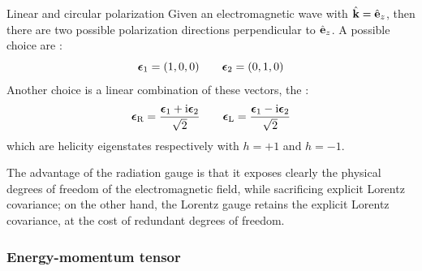 \begin{example}{Linear and circular polarization}{}
  Given an electromagnetic wave with $ \hat{\mathbf{k}} = \hat{\mathbf{e}}_z $, then there are two possible polarization directions perpendicular to $ \hat{\mathbf{e}}_z $. A possible choice are :
  \begin{equation}
    \boldsymbol{\epsilon}_1 = (1, 0, 0)
    \qquad
    \boldsymbol{\epsilon}_2 = (0, 1, 0)
  \end{equation}
  Another choice is a linear combination of these vectors, the :
  \begin{equation}
    \boldsymbol{\epsilon}_\text{R} = \frac{\boldsymbol{\epsilon}_1 + \mathrm{i} \boldsymbol{\epsilon}_2}{\sqrt{2}}
    \qquad
    \boldsymbol{\epsilon}_\text{L} = \frac{\boldsymbol{\epsilon}_1 - \mathrm{i} \boldsymbol{\epsilon}_2}{\sqrt{2}}
    \label{eq:circ-pol-vec}
  \end{equation}
  which are helicity eigenstates respectively with $ h = +1 $ and $ h = -1 $.
\end{example}

The advantage of the radiation gauge is that it exposes clearly the physical degrees of freedom of the electromagnetic field, while sacrificing explicit Lorentz covariance; on the other hand, the Lorentz gauge retains the explicit Lorentz covariance, at the cost of redundant degrees of freedom.

\subsubsection{Energy-momentum tensor}


